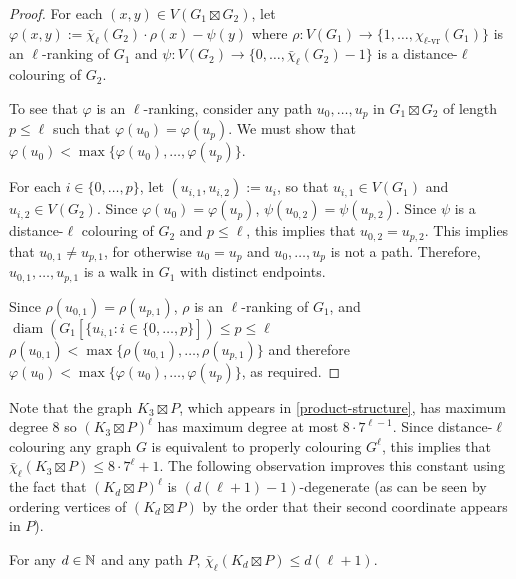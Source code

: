 \documentclass[kpfonts]{patmorin}
\DeclareMathOperator{\diam}{diam}
\newcommand{\rn}[1]{\chi_{\operatorname{#1-vr}}}
\newcommand{\lrn}{\rn{\ell}}
\newcommand{\dlcn}{\bar{\chi}_\ell}
\theoremstyle{named}
\begin{document}
\begin{proof}
    For each $(x,y)\in V(G_1\boxtimes G_2)$, let $\varphi(x,y):=\dlcn(G_2)\cdot \rho(x) - \psi(y)$ where $\rho:V(G_1)\to\{1,\ldots,\lrn(G_1)\}$ is an $\ell$-ranking of $G_1$ and $\psi:V(G_2)\to\{0,\ldots,\dlcn(G_2)-1\}$ is a distance-$\ell$ colouring of $G_2$.

    To see that $\varphi$ is an $\ell$-ranking, consider any
    path $u_0,\ldots,u_p$ in $G_1\boxtimes G_2$ of length $p\le\ell$ such that $\varphi(u_0)=\varphi(u_p)$.  We must show that $\varphi(u_0)<\max\{\varphi(u_0),\ldots,\varphi(u_p)\}$.

    For each $i\in\{0,\ldots,p\}$, let $(u_{i,1},u_{i,2}):=u_i$, so that $u_{i,1}\in V(G_1)$ and $u_{i,2}\in V(G_2)$. Since $\varphi(u_0)=\varphi(u_p)$, $\psi(u_{0,2})=\psi(u_{p,2})$. Since $\psi$ is a distance-$\ell$ colouring of $G_2$ and $p\le\ell$, this implies that $u_{0,2}=u_{p,2}$.  This implies that $u_{0,1}\neq u_{p,1}$, for otherwise $u_0=u_p$ and $u_0,\ldots,u_p$ is not a path.  Therefore, $u_{0,1},\ldots,u_{p,1}$ is a walk in $G_1$ with distinct endpoints.

    Since $\rho(u_{0,1})=\rho(u_{p,1})$, $\rho$ is an $\ell$-ranking of $G_1$, and $\diam(G_1[\{u_{i,1}:i\in\{0,\ldots,p\}])\le p\le\ell$  $\rho(u_{0,1})<\max\{\rho(u_{0,1}),\ldots,\rho(u_{p,1})\}$ and therefore $\varphi(u_0)<\max\{\varphi(u_0),\ldots,\varphi(u_p)\}$, as required.
\end{proof}

Note that the graph $K_3\boxtimes P$, which appears in \cref{product-structure}, has maximum degree 8 so $(K_3\boxtimes P)^\ell$ has maximum degree at most $8\cdot 7^{\ell-1}$.  Since distance-$\ell$ colouring any graph $G$ is equivalent to properly colouring $G^{\ell}$, this implies that $\dlcn(K_3\boxtimes P)\le 8\cdot7^\ell+1$. The following observation improves this constant using the fact that $(K_d\boxtimes P)^\ell$ is $(d(\ell+1)-1)$-degenerate (as can be seen by ordering vertices of $(K_d\boxtimes P)$ by the order that their second coordinate appears in $P$).

\begin{obs}\label{dumb}
    For any $d\in\mathbb{N}$ and any path $P$, $\dlcn(K_d\boxtimes P)\le d(\ell+1)$.
\end{obs}

%
\end{document}
